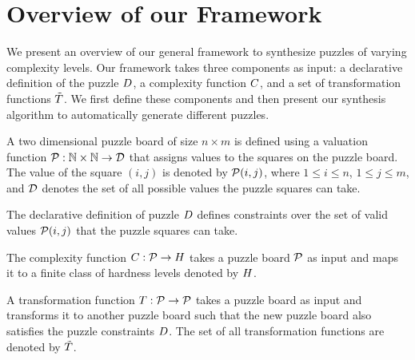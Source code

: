 \section{Overview of our Framework}

We present an overview of our general framework to synthesize puzzles
of varying complexity levels. Our framework takes three components as
input: a declarative definition of the puzzle $D$, a
complexity function $C$, and a set of transformation
functions $\tilde{T}$. We first define these components and
then present our synthesis algorithm to automatically generate
different puzzles.

\begin{definition}
A two dimensional puzzle board of size $n \times m$ is defined using a
valuation function $\mathcal{P}: \mathbb{N} \times \mathbb{N}
\rightarrow \mathcal{D}$ that assigns values to the squares on the
puzzle board. The value of the square $(i,j)$ is denoted by
$\mathcal{P}(i,j)$, where $1 \leq i \leq n$, $1 \leq j \leq m$, and
$\mathcal{D}$ denotes the set of all possible values the puzzle
squares can take.
\end{definition}

\begin{definition}
The declarative definition of puzzle $D$ defines constraints over the set of valid values $\mathcal{P}(i,j)$ that the puzzle squares can take.
\end{definition}

\begin{definition}
The complexity function $C : \mathcal{P} \rightarrow
H$ takes a puzzle board $\mathcal{P}$ as input and maps
it to a finite class of hardness levels denoted by $H$.
\end{definition}

\begin{definition}
A transformation function $T : \mathcal{P} \rightarrow
\mathcal{P}$ takes a puzzle board as input and transforms it to
another puzzle board such that the new puzzle board also satisfies the
puzzle constraints $D$. The set of all transformation
functions are denoted by $\tilde{T}$.
\end{definition}


